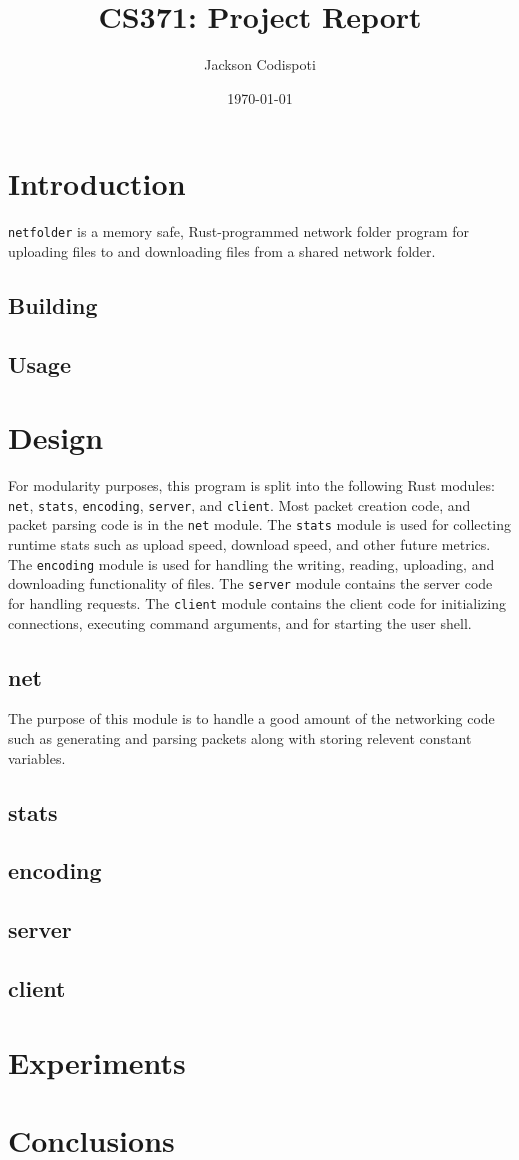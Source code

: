 \documentclass{article}
\title{CS371: Project Report}
\author{Jackson Codispoti}
\date\today
\begin{document}
\maketitle %

\section{Introduction}
\verb|netfolder| is a memory safe, Rust-programmed network folder program for uploading files to and downloading files from a shared network folder. 
\subsection{Building}
\subsection{Usage}

\section{Design}
For modularity purposes, this program is split into the following Rust modules: \verb|net|, \verb|stats|, \verb|encoding|, \verb|server|, and \verb|client|.
Most packet creation code, and packet parsing code is in the \verb|net| module.
The \verb|stats| module is used for collecting runtime stats such as upload speed, download speed, and other future metrics.
The \verb|encoding| module is used for handling the writing, reading, uploading, and downloading functionality of files.
The \verb|server| module contains the server code for handling requests.
The \verb|client| module contains the client code for initializing connections, executing command arguments, and for starting the user shell.
\subsection{net}
The purpose of this module is to handle a good amount of the networking code such as generating and parsing packets along with storing relevent constant variables.

\subsection{stats}
\subsection{encoding}
\subsection{server}
\subsection{client}

\section{Experiments}
\section{Conclusions}
\end{document}
